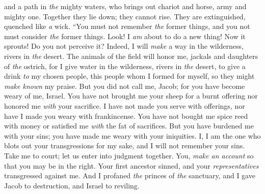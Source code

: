 \begin{biblechapter}
and a path in \textit{the} mighty waters,
\verse who brings out chariot and horse, 
army and mighty one. 
Together they lie down; 
they cannot rise. 
They are extinguished, 
quenched like \textit{a} wick.
\verse “You must not remember \textit{the} former things, 
and you not must consider \textit{the} former things.
\verse Look! I \textit{am} about to do a new thing! Now it sprouts! 
Do you not perceive it? 
Indeed, I will \textit{make} a way in the wilderness, 
rivers in \textit{the} desert.
\verse The animals of the field will honor me, 
jackals and daughters of \textit{the} ostrich, 
for I give water in the wilderness, 
rivers in \textit{the} desert, 
to give a drink \textit{to} my chosen people,
\verse this people whom I formed for myself, 
so they might \textit{make known} my praise.
\verse But you did not call me, Jacob; 
for you have become weary of me, Israel.
\verse You have not brought me your sheep for a burnt offering 
nor honored me \textit{with} your sacrifice. 
I have not made you serve with offerings, 
nor have I made you weary with frankincense.
\verse You have not bought me spice reed with money 
or satisfied me \textit{with} the fat of sacrifices. 
But you have burdened me with your sins; 
you have made me weary with your iniquities.
\verse I, I am the one who blots out your transgressions for my sake, 
and I will not remember your sins.
\verse Take me to court; let us enter into judgment together. 
You, \textit{make an account} so that you may be in the right.
\verse Your first ancestor sinned, 
and your \textit{representatives} transgressed against me.
\verse And I profaned \textit{the} princes of \textit{the} sanctuary, 
and I gave Jacob to destruction, and Israel to reviling.
\end{biblechapter}

